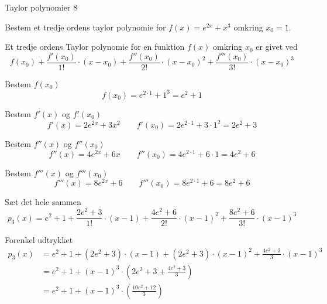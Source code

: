 \documentclass{article}
\begin{document}
\begin{exercise}{Taylor polynomier 8}
	
	Bestem et tredje ordens taylor polynomie for $f(x) = e^{2x} + x^3$
	omkring $x_0 = 1$.
	
	
	\hint
	Et tredje ordens Taylor polynomie for en funktion $f(x)$
	omkring $x_0$ er givet ved
	\[
	f(x_0) + \frac{f'(x_0)}{1!} \cdot (x - x_0) 
	+ \frac{f''(x_0)}{2!} \cdot (x - x_0)^2 
	+ \frac{f'''(x_0)}{3!} \cdot (x - x_0)^3 
	\]
	
	
	\hint
	Bestem $f(x_0)$
	\[
	f(x_0)  = e^{2 \cdot 1} + 1^3 = e^2 + 1
	\]
	
	\hint
	Bestem $f'(x)$ og $f'(x_0)$
	\[
	f'(x) = 2 e^{2x} + 3x^2  \qquad f'(x_0)= 2e^{2 \cdot 1} + 3 \cdot 1^2 = 2e^2 + 3
	\]
	
	\hint
	Bestem $f''(x)$ og $f''(x_0)$
	\[
	f''(x) = 4e^{2x} + 6x \qquad f''(x_0)  = 4e^{2 \cdot 1} + 6 \cdot 1 = 4e^2 + 6
	\]
	
	\hint
	Bestem $f'''(x)$ og $f'''(x_0)$
	\[
	f'''(x) = 8 e^{2x} + 6 \qquad f'''(x_0) =  8e^{2 \cdot 1} + 6 = 8e^2 + 6
	\]
	
	\hint
	Sæt det hele sammen
	\[
	p_3(x) = e^2 + 1 + \frac{2e^2 + 3}{1!} \cdot (x-1) + \frac{4e^2+6}{2!} \cdot (x-1)^2 + \frac{8e^2 + 6}{3!} \cdot (x-1)^3	
	\]
	
	\hint
	Forenkel udtrykket
	\begin{align*}
	p_3(x) &= e^2 + 1 + (2e^2 + 3) \cdot (x-1) + (2e^2+3) \cdot (x-1)^2 + \frac{4e^2 + 3}{3} \cdot (x-1)^3 \\
			   &= e^2 + 1 + (x-1)^3 \cdot \left(2e^2 + 3 + \frac{4e^2 + 3}{3} \right) \\
			   &= e^2 + 1 + (x-1)^3 \cdot \left(  \frac{10e^2 + 12}{3} \right) 
	\end{align*}
	
\end{exercise}
\end{document}
